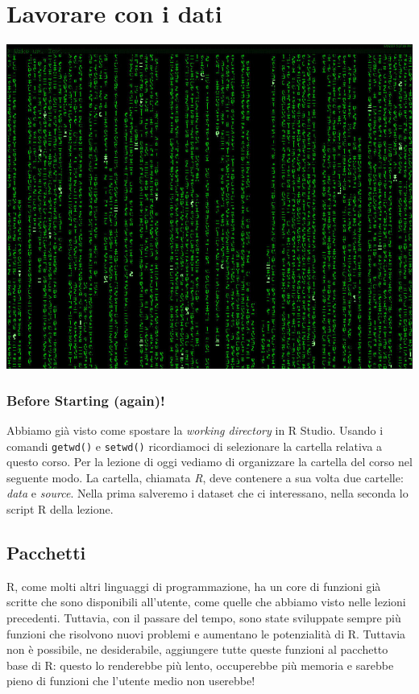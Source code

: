 \documentclass[]{book}
\begin{document}
\hypertarget{lavorare-con-i-dati}{%
\chapter{Lavorare con i dati}\label{lavorare-con-i-dati}}

\includegraphics{./media/Data_matrix.jpg}

\hypertarget{before-starting-again}{%
\subsection*{Before Starting (again)!}\label{before-starting-again}}

Abbiamo già visto come spostare la \emph{working directory} in R Studio. Usando i comandi \texttt{getwd()} e \texttt{setwd()} ricordiamoci di selezionare la cartella relativa a questo corso. Per la lezione di oggi vediamo di organizzare la cartella del corso nel seguente modo.
La cartella, chiamata \emph{R}, deve contenere a sua volta due cartelle: \emph{data} e \emph{source}. Nella prima salveremo i dataset che ci interessano, nella seconda lo script R della lezione.

\hypertarget{pacchetti}{%
\section{Pacchetti}\label{pacchetti}}

R, come molti altri linguaggi di programmazione, ha un core di funzioni già scritte che sono disponibili all'utente, come quelle che abbiamo visto nelle lezioni precedenti. Tuttavia, con il passare del tempo, sono state sviluppate sempre più funzioni che risolvono nuovi problemi e aumentano le potenzialità di R. Tuttavia non è possibile, ne desiderabile, aggiungere tutte queste funzioni al pacchetto base di R: questo lo renderebbe più lento, occuperebbe più memoria e sarebbe pieno di funzioni che l'utente medio non userebbe!
\end{document}

